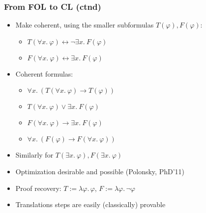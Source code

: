 \documentclass[handout,11pt]{beamer}
\newcommand{\liff}{\leftrightarrow}
\begin{document}
\begin{frame}
\frametitle{From FOL to CL (ctnd)}
 \begin{itemize}[<+->]
\item Make coherent, using the smaller subformulas $T(\varphi),F(\varphi)$:
 \begin{itemize}
 \item $T(\forall x.~\varphi) \liff \neg\exists x.~F(\varphi)$
 \item $F(\forall x.~\varphi) \liff \exists x.~F(\varphi)$
 \end{itemize}
\item Coherent formulas:
 \begin{itemize}
 \item $\forall x.~(T(\forall x.~\varphi) \to T(\varphi))$
 \item $T(\forall x.~\varphi) \lor \exists x.~F(\varphi)$
 \item $F(\forall x.~\varphi) \to \exists x.~F(\varphi)$
 \item $\forall x.~(F(\varphi) \to F(\forall x.~\varphi))$
 \end{itemize}
\item Similarly for $T(\exists x.~\varphi),F(\exists x.~\varphi)$
\item Optimization desirable and possible (Polonsky, PhD'11)
\item Proof recovery: $T:= \lambda\varphi.\,\varphi$, $F:= \lambda\varphi.\,\neg\varphi$
\item Translations steps are easily (classically) provable
\end{itemize}
\end{frame}
 
\end{document}
